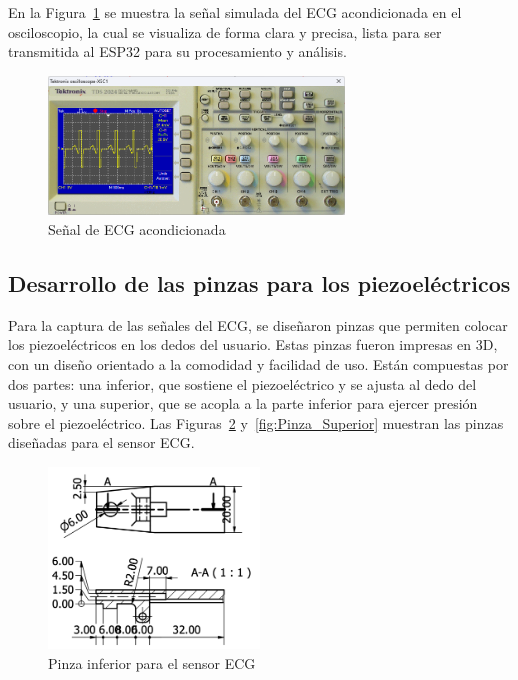         En la Figura~\ref{fig:Simulacion_senial_ECG} se muestra la señal simulada del ECG acondicionada en el osciloscopio, la cual se visualiza de forma clara y precisa, lista para ser transmitida al ESP32 para su procesamiento y análisis.

        \begin{figure}[H]
            \centering
            \includegraphics[width=0.7\textwidth]{img/Desarrollo/multisim_simulacion.png}
            \caption[Señal de ECG acondicionada.]{Señal de ECG acondicionada\footnotemark}
            \label{fig:Simulacion_senial_ECG}
        \end{figure}

    \subsection{Desarrollo de las pinzas para los piezoeléctricos}

    Para la captura de las señales del ECG, se diseñaron pinzas que permiten colocar los piezoeléctricos en los dedos del usuario. Estas pinzas fueron impresas en 3D, con un diseño orientado a la comodidad y facilidad de uso. Están compuestas por dos partes: una inferior, que sostiene el piezoeléctrico y se ajusta al dedo del usuario, y una superior, que se acopla a la parte inferior para ejercer presión sobre el piezoeléctrico. Las Figuras~\ref{fig:Pinza_Inferior} y~\ref{fig:Pinza_Superior} muestran las pinzas diseñadas para el sensor ECG.

    \begin{figure}[H]
        \centering
        \includegraphics[width=0.5\textwidth]{img/Desarrollo/pinza_Inferior.png}
        \caption{Pinza inferior para el sensor ECG}
        \label{fig:Pinza_Inferior}
    \end{figure}


